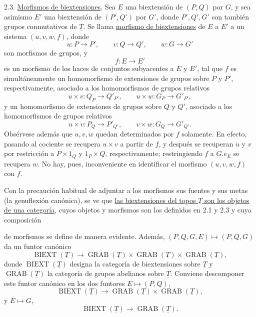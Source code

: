 
2.3. \underline{Morfismos de biextensiones}. Sea $E$ una biextensión
de $(P,Q)$ por $G$, y sea asimismo $E'$ una biextensión de $(P',Q')$
por $G'$, donde $P',Q',G'$ son también grupos conmutativos de
$\underline T$. Se llama \underline{morfismo de biextensiones} de $E$
a $E'$ a un sistema $(u,v,w,f)$, donde
\begin{equation}\tag{2.3.1}
 u:P\longrightarrow P',\qquad
 v:Q\longrightarrow Q',\qquad
 w:G\longrightarrow G'
\end{equation}
son morfismos de grupos, y
\begin{equation}\tag{2.3.2}
 f:E\longrightarrow E'
\end{equation}
es un morfismo de los haces de conjuntos subyacentes a $E$ y $E'$, tal
que $f$ es simultáneamente un homomorfismo de extensiones de grupos
sobre $P$ y $P'$, respectivamente, asociado a los homomorfismos de
grupos relativos
\[
 u\times v:Q_P\longrightarrow Q'_{P'},
 \qquad
 u\times w:G_P\longrightarrow G'_{P'},
\]
y un homomorfismo de extensiones de grupos sobre $Q$ y $Q'$, asociado
a los homomorfismos de grupos relativos
\[
 u\times v:P_Q\longrightarrow P'_{Q'},
 \qquad
 v\times w:G_Q\longrightarrow G'_{Q'}.
\]
Obsérvese además que $u,v,w$ quedan determinados por $f$ solamente. En
efecto, pasando al cociente se recupera $u\times v$ a partir de $f$, y
después se recuperan $u$ y $v$ por restricción a $P\times1_Q$ y
$1_P\times Q$, respectivamente; restringiendo $f$ a $G.e_E$ se
recupera $w$. No hay, pues, inconveniente en identificar el morfismo
$(u,v,w,f)$ con $f$.

Con la precaución habitual de adjuntar a los morfismos sus fuentes y
sus metas (la genuflexión canónica), se ve que \underline{las
biextensiones del topos $\underline T$ son los objetos de una
categoría}, cuyos objetos y morfismos son los definidos en 2.1 y 2.3 y
cuya composición


de morfismos se define de manera evidente. Además,
$(P,Q,G,E)\mapsto(P,Q,G)$ da un funtor canónico
\begin{equation}\tag{2.3.3}
 \operatorname{BIEXT}(\underline T)
 \longrightarrow
 \operatorname{GRAB}(\underline T)\times
 \operatorname{GRAB}(\underline T)\times
 \operatorname{GRAB}(\underline T),
\end{equation}
donde $\operatorname{BIEXT}(\underline T)$ designa la categoría de
biextensiones sobre $\underline T$ y
$\operatorname{GRAB}(\underline T)$ la categoría de grupos abelianos
sobre $\underline T$. Conviene descomponer este funtor canónico en los
dos funtores $E\mapsto(P,Q)$,
\begin{equation}\tag{2.3.4}
 \operatorname{BIEXT}(\underline T)
 \longrightarrow
 \operatorname{GRAB}(\underline T)\times
 \operatorname{GRAB}(\underline T),
\end{equation}
y $E\mapsto G$,
\begin{equation}\tag{2.3.5}
 \operatorname{BIEXT}(\underline T)
 \longrightarrow
 \operatorname{GRAB}(\underline T).
\end{equation}

